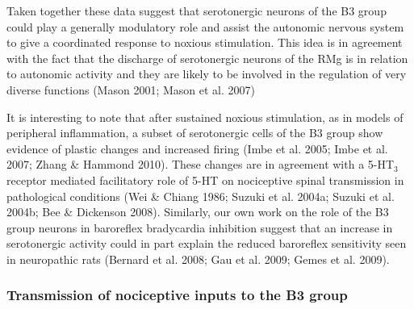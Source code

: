 \documentclass[a4paper,12pt,twoside]{report}
\begin{document}
Taken together these data suggest that serotonergic neurons of the B3 group could play a generally modulatory role and assist the autonomic nervous system to give a coordinated response to noxious stimulation. This idea is in agreement with the fact that the discharge of serotonergic neurons of the RMg is in relation to autonomic activity and they are likely to be involved in the regulation of very diverse functions (Mason 2001; Mason et al. 2007)

It is interesting to note that after sustained noxious stimulation, as in models of peripheral inflammation, a subset of serotonergic cells of the B3 group show evidence of plastic changes and increased firing (Imbe et al. 2005; Imbe et al. 2007; Zhang \& Hammond 2010). These changes are in agreement with a 5-HT$_{3}$ receptor mediated facilitatory role of 5-HT on nociceptive spinal transmission in pathological conditions (Wei \& Chiang 1986; Suzuki et al. 2004a; Suzuki et al. 2004b; Bee \& Dickenson 2008). Similarly, our own work on the role of the B3 group neurons in baroreflex bradycardia inhibition suggest that an increase in serotonergic activity could in part explain the reduced baroreflex sensitivity seen in neuropathic rats (Bernard et al. 2008; Gau et al. 2009; Gemes et al. 2009).

\subsubsection{Transmission of nociceptive inputs to the B3 group}
\end{document}
